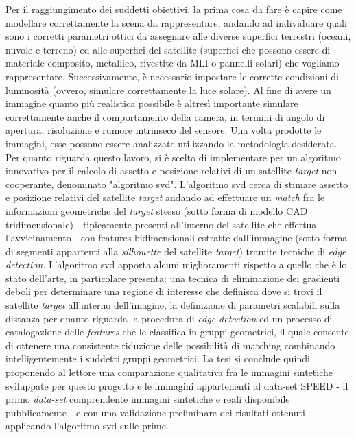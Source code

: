 Per il raggiungimento dei suddetti obiettivi, la prima cosa da fare è capire come modellare correttamente la scena da rappresentare, andando ad individuare quali sono i corretti parametri ottici da assegnare alle diverse superfici terrestri (oceani, nuvole e terreno) ed alle superfici del satellite (superfici che possono essere di materiale composito, metallico, rivestite da MLI o pannelli solari) che vogliamo rappresentare. Successivamente, è necessario impostare le corrette condizioni di luminosità (ovvero, simulare correttamente la luce solare). Al fine di avere un immagine quanto più realistica possibile è altresì importante simulare correttamente anche il comportamento della camera, in termini di angolo di apertura, risoluzione e rumore intrinseco del sensore. Una volta prodotte le immagini, esse possono essere analizzate utilizzando la metodologia desiderata. Per quanto riguarda questo lavoro, si è scelto di implementare per un algoritmo innovativo per il calcolo di assetto e posizione relativi di un satellite \textit{target} non cooperante, denominato "algoritmo \acrshort{svd}".
L'algoritmo \acrshort{svd} cerca di stimare assetto e posizione relativi del satellite \textit{target} andando ad effettuare un \textit{match} fra le informazioni geometriche del \textit{target} stesso (sotto forma di modello CAD tridimensionale)  - tipicamente presenti all'interno del satellite che effettua l'avvicinamento - con features bidimensionali estratte dall'immagine (sotto forma di segmenti appartenti alla \textit{silhouette} del satellite \textit{target}) tramite tecniche di \textit{edge detection}.
L'algoritmo \acrshort{svd} apporta alcuni miglioramenti rispetto a quello che è lo stato dell'arte, in particolare presenta: una tecnica di eliminazione dei gradienti deboli per determinare una regione di interesse che definisca dove si trovi il satellite \textit{target} all'interno dell'imagine, la definizione di parametri scalabili sulla distanza per quanto riguarda la procedura di \textit{edge detection} ed un processo di catalogazione delle \textit{features} che le classifica in gruppi geometrici, il quale consente di ottenere una consistente riduzione delle possibilità di matching combinando intelligentemente i suddetti gruppi geometrici. 
La tesi si conclude quindi proponendo al lettore una comparazione qualitativa fra le immagini sintetiche sviluppate per questo progetto  e le immagini appartenenti al data-set SPEED - il primo \textit{data-set} comprendente immagini sintetiche e reali disponibile pubblicamente - e con una validazione preliminare dei risultati ottenuti applicando l'algoritmo \acrshort{svd} sulle prime.